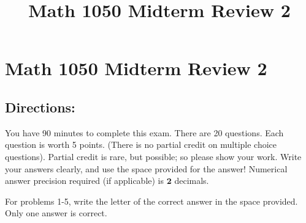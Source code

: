 \documentclass{ximera}
\title{Math 1050 Midterm Review 2}
\begin{document}
\section*{Math 1050 Midterm Review 2}

\subsection*{Directions:} You have 90 minutes to complete this exam. There are 20 questions. Each question is worth 5 points. (There is no partial credit on multiple choice questions). Partial credit is rare, but possible; so please show your work. Write your answers clearly, and use the space provided for the answer! Numerical answer precision required (if applicable) is $\mathbf{2}$ decimals.

For problems 1-5, write the letter of the correct answer in the space provided. Only one answer is correct.\\
\end{document}
